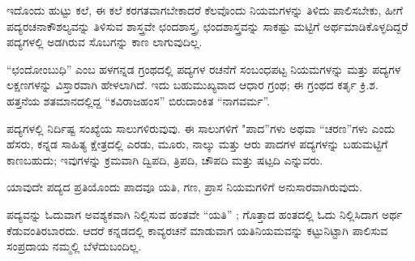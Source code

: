 

\indent ಇದೊಂದು ಹುಟ್ಟು ಕಲೆ, ಈ ಕಲೆ ಕರಗತವಾಗಬೇಕಾದರೆ ಕೆಲವೊಂದು ನಿಯಮಗಳನ್ನು ತಿಳಿದು ಪಾಲಿಸಬೇಕು, ಹೀಗೆ ಪದ್ಯರಚನಾಕೌಶಲ್ಯವನ್ನು ತಿಳಿಸುವ ಶಾಸ್ತ್ರವೇ ಛಂದಶಾಸ್ತ್ರ, ಛಂದಶಾಸ್ತ್ರವನ್ನು ಸಾಕಷ್ಟು ಮಟ್ಟಿಗೆ ಅರ್ಥಮಾಡಿಕೊಳ್ಳದಿದ್ದರೆ ಪದ್ಯಗಳಲ್ಲಿ ಅಡಗಿರುವ ಸೊಬಗನ್ನು ಕಾಣ ಲಾಗುವುದಿಲ್ಲ.\par

\indent “ಛಂದೋಂಬುಧಿ” ಎಂಬ ಹಳಗನ್ನಡ ಗ್ರಂಥದಲ್ಲಿ ಪದ್ಯಗಳ ರಚನೆಗೆ ಸಂಬಂಧಪಟ್ಟ ನಿಯಮಗಳನ್ನು ಮತ್ತು ಪದ್ಯಗಳ ಲಕ್ಷಣಗಳನ್ನು ವಿಸ್ತಾರವಾಗಿ ಹೇಳಲಾಗಿದೆ. ಇದು ಬಹುಮುಖ್ಯವಾದ ಆಧಾರ ಗ್ರಂಥ; ಈ ಗ್ರಂಥದ ಕರ್ತೃ ಕ್ರಿ.ಶ. ಹತ್ತನೆಯ ಶತಮಾನದಲ್ಲಿದ್ದ “ಕವಿರಾಜಹಂಸ” ಬಿರುದಾಂಕಿತ “ನಾಗವರ್ಮ”.\par

\indent ಪದ್ಯಗಳಲ್ಲಿ ನಿರ್ದಿಷ್ಟ ಸಂಖ್ಯೆಯ ಸಾಲುಗಳಿರುವುವು. ಈ ಸಾಲುಗಳಿಗೆ "ಪಾದ”ಗಳು ಅಥವಾ “ಚರಣ”ಗಳು ಎಂದು ಹೆಸರು, ಕನ್ನಡ ಸಾಹಿತ್ಯ ಕ್ಷೇತ್ರದಲ್ಲಿ ಎರಡು, ಮೂರು, ನಾಲ್ಕು ಮತ್ತು ಆರು ಪಾದಗಳ ಪದ್ಯಗಳನ್ನು ಬಹುಮಟ್ಟಿಗೆ ಕಾಣಬಹುದು; ಇವುಗಳನ್ನು ಕ್ರಮವಾಗಿ ದ್ವಿಪದಿ, ತ್ರಿಪದಿ, ಚೌಪದಿ ಮತ್ತು ಷಟ್ಪದಿ ಎನ್ನುವರು.\par

\indent ಯಾವುದೇ ಪದ್ಯದ ಪ್ರತಿಯೊಂದು ಪಾದವೂ ಯತಿ, ಗಣ, ಪ್ರಾಸ ನಿಯಮಗಳಿಗೆ ಅನುಸಾರವಾಗಿರುವುದು.\par

\vspace{4pt plus 4pt minus 1pt}\hspace{0.5em}ಪದ್ಯವನ್ನು ಓದುವಾಗ ಅವಶ್ಯಕವಾಗಿ ನಿಲ್ಲಿಸುವ ಹಂತವೇ “ಯತಿ” ; ಗೊತ್ತಾದ ಹಂತದಲ್ಲಿ ಓದು ನಿಲ್ಲಿಸಿದಾಗ ಅರ್ಥ ಕೆಡುವಂತಿರಬಾರದು. ಆದರೆ ಕನ್ನಡದಲ್ಲಿ ಕಾವ್ಯರಚನೆ ಮಾಡುವಾಗ ಯತಿನಿಯಮವನ್ನು ಕಟ್ಟುನಿಟ್ಟಾಗಿ ಪಾಲಿಸುವ ಸಂಪ್ರದಾಯ ನಮ್ಮಲ್ಲಿ ಬೆಳೆದುಬಂದಿಲ್ಲ.\par
